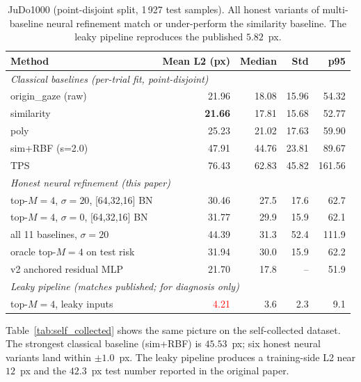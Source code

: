 \begin{table}[t]
\caption{JuDo1000 (point-disjoint split, 1\,927 test samples). All
honest variants of multi-baseline neural refinement match or
under-perform the similarity baseline. The leaky pipeline reproduces
the published $5.82$~px.}
\label{tab:judo}
\centering
\small
\begin{tabular}{lrrrr}
\toprule
Method & Mean L2 (px) & Median & Std & p95 \\
\midrule
\multicolumn{5}{l}{\emph{Classical baselines (per-trial fit, point-disjoint)}}\\
origin\_gaze (raw)              & 21.96 & 18.08 & 15.96 & 54.32 \\
similarity                      & \textbf{21.66} & 17.81 & 15.68 & 52.77 \\
poly                            & 25.23 & 21.02 & 17.63 & 59.90 \\
sim+RBF (s=2.0)                 & 47.91 & 44.76 & 23.81 & 89.67 \\
TPS                             & 76.43 & 62.83 & 45.82 & 161.56 \\
\midrule
\multicolumn{5}{l}{\emph{Honest neural refinement (this paper)}}\\
top-$M{=}4$, $\sigma{=}20$, [64,32,16] BN     & 30.46 & 27.5  & 17.6 & 62.7 \\
top-$M{=}4$, $\sigma{=}0$,  [64,32,16] BN     & 31.77 & 29.9  & 15.9 & 62.1 \\
all 11 baselines, $\sigma{=}20$ & 44.39 & 31.3  & 52.4 & 111.9 \\
oracle top-$M{=}4$ on test risk & 31.94 & 30.0  & 15.9 & 62.2 \\
v2 anchored residual MLP        & 21.70 & 17.8  &   -- & 51.9 \\
\midrule
\multicolumn{5}{l}{\emph{Leaky pipeline (matches published; for diagnosis only)}}\\
top-$M{=}4$, leaky inputs       & \textcolor{red}{4.21} & 3.6 & 2.3 & 9.1 \\
\bottomrule
\end{tabular}
\end{table}

Table~\ref{tab:self_collected} shows the same picture on the
self-collected dataset. The strongest classical baseline (sim+RBF) is
$45.53$~px; six honest neural variants land within $\pm 1.0$~px. The
leaky pipeline produces a training-side L2 near $12$~px and the
$42.3$~px test number reported in the original paper.

